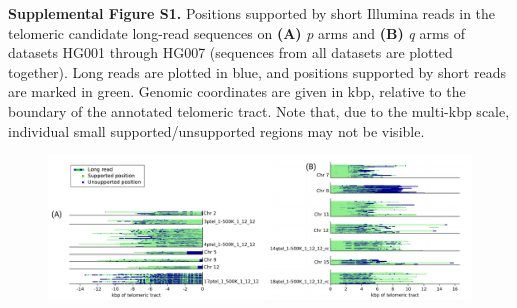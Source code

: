 \documentclass{article}
\begin{document}
\begin{samepage}

\noindent \textbf{Supplemental Figure S1.}
Positions supported by short Illumina reads in the telomeric candidate long-read sequences on \textbf{(A)} \textit{p} arms and \textbf{(B)} \textit{q} arms of datasets HG001 through HG007 (sequences from all datasets are plotted together).
Long reads are plotted in blue, and positions supported by short reads are marked in green.
Genomic coordinates are given in kbp, relative to the boundary of the annotated telomeric tract.
Note that, due to the multi-kbp scale, individual small supported/unsupported regions may not be visible.

\begin{figure}[h!] \centering
\includegraphics[width=\textwidth,keepaspectratio]{Figure_S1-nolegend.pdf}
\end{figure}

\end{samepage}
\end{document}
